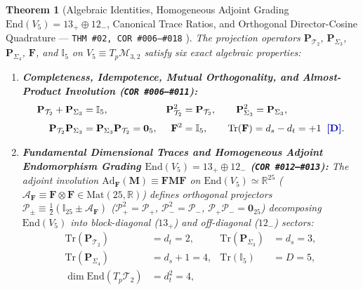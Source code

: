 \documentclass[11pt,a4paper]{article}
\newcommand{\catD}{\text{\textbf{\textcolor{blue!75!black}{[D]}}}}
\theoremstyle{definition}
\theoremstyle{plain}
\newtheorem{theorem}[axiom]{Theorem}
\theoremstyle{remark}
\begin{document}
\begin{theorem}[Algebraic Identities, Homogeneous Adjoint Grading $\mathrm{End}(V_5) = 13_+ \oplus 12_-$, Canonical Trace Ratios, and Orthogonal Director-Cosine Quadrature --- \texttt{THM~\#02, COR~\#006--\#018} \catD]\label{thm:c1_tangent_traces}\label{thm:c1_projector_identities}
The projection operators $\mathbf{P}_{\mathcal{T}_2}$, $\mathbf{P}_{\Sigma_3}$, $\mathbf{P}_{\Sigma_4}$, $\mathbf{F}$, and $\mathbb{I}_5$ on $V_5 \equiv T_p\mathcal{M}_{3,2}$ satisfy six exact algebraic properties:
\begin{enumerate}[label=(\roman*)]
  \item \textbf{Completeness, Idempotence, Mutual Orthogonality, and Almost-Product Involution (\texttt{COR~\#006--\#011}):}
  \begin{align}
  \mathbf{P}_{\mathcal{T}_2} + \mathbf{P}_{\Sigma_3} &= \mathbb{I}_5, &
  \mathbf{P}_{\mathcal{T}_2}^2 &= \mathbf{P}_{\mathcal{T}_2}, \qquad
  \mathbf{P}_{\Sigma_3}^2 = \mathbf{P}_{\Sigma_3}, \nonumber \\[3pt]
  \mathbf{P}_{\mathcal{T}_2}\mathbf{P}_{\Sigma_3} &= \mathbf{P}_{\Sigma_3}\mathbf{P}_{\mathcal{T}_2} = \mathbf{0}_5, &
  \mathbf{F}^2 &= \mathbb{I}_5, \qquad
  \mathrm{Tr}(\mathbf{F}) = d_s - d_t = +1 \;\;\catD. \label{eq:c1_proj_orthogonality}
  \end{align}
  \item \textbf{Fundamental Dimensional Traces and Homogeneous Adjoint Endomorphism Grading $\mathrm{End}(V_5) = 13_+ \oplus 12_-$ (\texttt{COR~\#012--\#013}):}
  The adjoint involution $\mathrm{Ad}_{\mathbf{F}}(\mathbf{M}) \equiv \mathbf{F}\mathbf{M}\mathbf{F}$ on $\mathrm{End}(V_5) \simeq \mathbb{R}^{25}$ ($\mathcal{A}_{\mathbf{F}} \equiv \mathbf{F}\otimes\mathbf{F} \in \mathrm{Mat}(25,\mathbb{R})$) defines orthogonal projectors $\mathcal{P}_\pm \equiv \frac{1}{2}(\mathbb{I}_{25} \pm \mathcal{A}_{\mathbf{F}})$ ($\mathcal{P}_+^2=\mathcal{P}_+$, $\mathcal{P}_-^2=\mathcal{P}_-$, $\mathcal{P}_+\mathcal{P}_-=\mathbf{0}_{25}$) decomposing $\mathrm{End}(V_5)$ into block-diagonal ($13_+$) and off-diagonal ($12_-$) sectors:
  \begin{align}
  \mathrm{Tr}\!\left(\mathbf{P}_{\mathcal{T}_2}\right) &= d_t = 2, &
  \mathrm{Tr}\!\left(\mathbf{P}_{\Sigma_3}\right) &= d_s = 3, \nonumber \\[3pt]
  \mathrm{Tr}\!\left(\mathbf{P}_{\Sigma_4}\right) &= d_s + 1 = 4, &
  \mathrm{Tr}\!\left(\mathbb{I}_5\right) &= D = 5, \nonumber \\[3pt]
  \dim\mathrm{End}\!\left(T_p\mathcal{T}_2\right) &= d_t^2 = 4, &

\end{align}
\end{enumerate}
\end{theorem}
\end{document}
